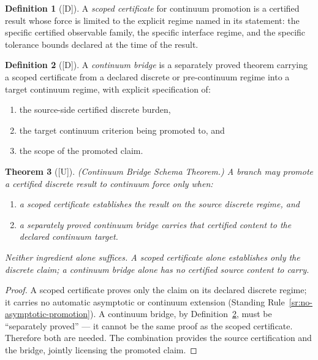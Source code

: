 \documentclass[12pt,oneside]{amsbook}
\theoremstyle{plain}
\newtheorem{theorem}{Theorem}[section]
\theoremstyle{definition}
\newtheorem{definition}[theorem]{Definition}
\theoremstyle{remark}
\newcommand{\status}[1]{\textup{[#1]}}
\begin{document}
\begin{definition}[\status{D}]\label{def:scoped-certificate}
A \emph{scoped certificate} for continuum promotion is a certified
result whose force is limited to the explicit regime named in its
statement: the specific certified observable family, the specific
interface regime, and the specific tolerance bounds declared at the
time of the result.
\end{definition}

\begin{definition}[\status{D}]\label{def:continuum-bridge}
A \emph{continuum bridge} is a separately proved theorem carrying a
scoped certificate from a declared discrete or pre-continuum regime
into a target continuum regime, with explicit specification of:
\begin{enumerate}[label=\textup{(\arabic*)}]
  \item the source-side certified discrete burden,
  \item the target continuum criterion being promoted to, and
  \item the scope of the promoted claim.
\end{enumerate}
\end{definition}

\begin{theorem}[\status{U}]\label{thm:continuum-bridge-schema}
\textup{(Continuum Bridge Schema Theorem.)}  A branch may promote a
certified discrete result to continuum force only when:
\begin{enumerate}[label=\textup{(\arabic*)}]
  \item a scoped certificate establishes the result on the source
        discrete regime, and
  \item a separately proved continuum bridge carries that certified
        content to the declared continuum target.
\end{enumerate}
Neither ingredient alone suffices.  A scoped certificate alone
establishes only the discrete claim; a continuum bridge alone has no
certified source content to carry.
\end{theorem}

\begin{proof}
A scoped certificate proves only the claim on its declared discrete
regime; it carries no automatic asymptotic or continuum extension
(Standing Rule~\ref{sr:no-asymptotic-promotion}).  A continuum bridge,
by Definition~\ref{def:continuum-bridge}, must be ``separately proved''
--- it cannot be the same proof as the scoped certificate.  Therefore
both are needed.  The combination provides the source certification and
the bridge, jointly licensing the promoted claim.
\end{proof}
\end{document}
